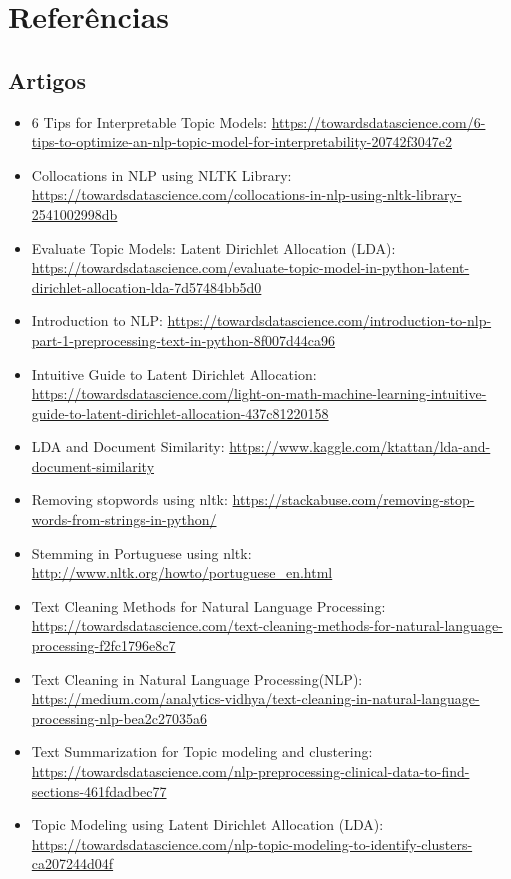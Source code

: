 \section{Referências}

\subsection{Artigos}

\begin{itemize}
    \item 6 Tips for Interpretable Topic Models: \url{https://towardsdatascience.com/6-tips-to-optimize-an-nlp-topic-model-for-interpretability-20742f3047e2}
    \item Collocations in NLP using NLTK Library: \url{https://towardsdatascience.com/collocations-in-nlp-using-nltk-library-2541002998db}
    \item Evaluate Topic Models: Latent Dirichlet Allocation (LDA): \url{https://towardsdatascience.com/evaluate-topic-model-in-python-latent-dirichlet-allocation-lda-7d57484bb5d0}
    \item Introduction to NLP: \url{https://towardsdatascience.com/introduction-to-nlp-part-1-preprocessing-text-in-python-8f007d44ca96}
    \item Intuitive Guide to Latent Dirichlet Allocation: \url{https://towardsdatascience.com/light-on-math-machine-learning-intuitive-guide-to-latent-dirichlet-allocation-437c81220158}
    \item LDA and Document Similarity: \url{https://www.kaggle.com/ktattan/lda-and-document-similarity}
    \item Removing stopwords using nltk: \url{https://stackabuse.com/removing-stop-words-from-strings-in-python/}
    \item Stemming in Portuguese using nltk: \url{http://www.nltk.org/howto/portuguese_en.html}
    \item Text Cleaning Methods for Natural Language Processing: \url{https://towardsdatascience.com/text-cleaning-methods-for-natural-language-processing-f2fc1796e8c7}
    \item Text Cleaning in Natural Language Processing(NLP): \url{https://medium.com/analytics-vidhya/text-cleaning-in-natural-language-processing-nlp-bea2c27035a6}
    \item Text Summarization for Topic modeling and clustering: \url{https://towardsdatascience.com/nlp-preprocessing-clinical-data-to-find-sections-461fdadbec77}
    \item Topic Modeling using Latent Dirichlet Allocation (LDA): \url{https://towardsdatascience.com/nlp-topic-modeling-to-identify-clusters-ca207244d04f}

\end{itemize}
